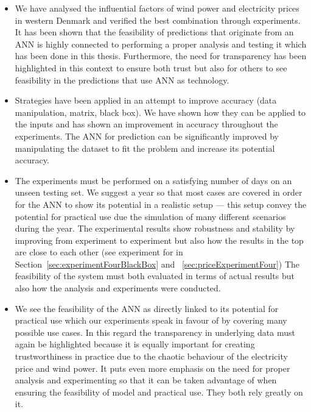 \begin{itemize}
\item We have analysed the influential factors of wind power and electricity prices in western Denmark and verified the best combination through experiments. It has been shown that the feasibility of predictions that originate from an ANN is highly connected to performing a proper analysis and testing it which has been done in this thesis. Furthermore, the need for transparency has been highlighted in this context to ensure both trust but also for others to see feasibility in the predictions that use ANN as technology.
\item Strategies have been applied in an attempt to improve accuracy (data manipulation, matrix, black box). We have shown how they can be applied to the inputs and has shown an improvement in accuracy throughout the experiments. The ANN for prediction can be significantly improved by manipulating the dataset to fit the problem and increase its potential accuracy.
\item The experiments must be performed on a satisfying number of days on an unseen testing set. We suggest a year so that most cases are covered in order for the ANN to show its potential in a realistic setup --- this setup convey the potential for practical use due the simulation of many different scenarios during the year. The experimental results show robustness and stability by improving from experiment to experiment but also how the results in the top are close to each other (see experiment for in Section~\ref{sec:experimentFourBlackBox} and ~\ref{sec:priceExperimentFour}) The feasibility of the system must both evaluated in terms of actual results but also how the analysis and experiments were conducted.
\item We see the feasibility of the ANN as directly linked to its potential for practical use which our experiments speak in favour of by covering many possible use cases. In this regard the transparency in underlying data must again be highlighted because it is equally important for creating trustworthiness in practice due to the chaotic behaviour of the electricity price and wind power. It puts even more emphasis on the need for proper analysis and experimenting so that it can be taken advantage of when ensuring the feasibility of model and practical use. They both rely greatly on it.  
\end{itemize}

